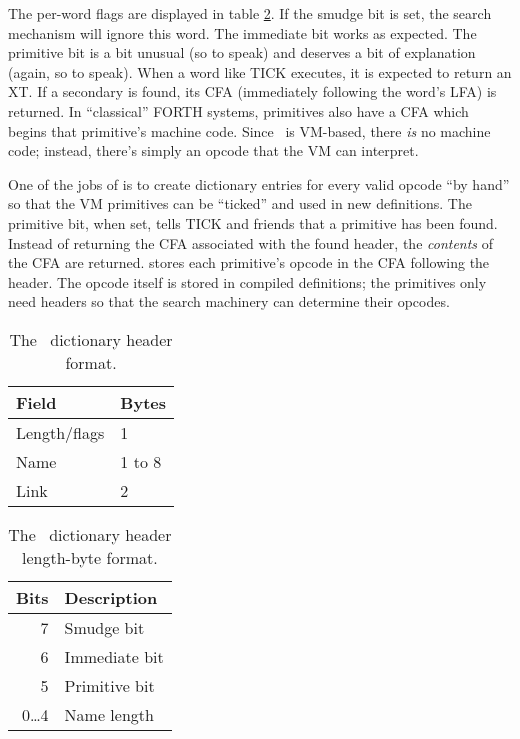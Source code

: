 \documentclass{article}
\begin{document}
The per-word flags are displayed in table \ref{t:hlen}. If the
smudge bit is set, the search mechanism will ignore this word. The
immediate bit works as expected. The primitive bit is a bit unusual
(so to speak) and deserves a bit of explanation (again, so to
speak). When a word like TICK executes, it is expected to return an
XT. If a secondary is found, its CFA (immediately following the
word's LFA) is returned. In ``classical'' FORTH systems, primitives
also have a CFA which begins that primitive's machine code. Since
\M\ is VM-based, there \textit{is} no machine code; instead, there's
simply an opcode that the VM can interpret.

One of the jobs of  is to create dictionary entries
for every valid opcode ``by hand'' so that the VM primitives can be
``ticked'' and used in new definitions. The primitive bit, when set,
tells TICK and friends that a primitive has been found. Instead of
returning the CFA associated with the found header, the
\textit{contents} of the CFA are returned.  stores
each primitive's opcode in the CFA following the header. The opcode
itself is stored in compiled definitions; the primitives only need
headers so that the search machinery can determine their opcodes.

\begin{table}
\begin{center}
\begin{tabular}{|l|l|} \hline
\textbf{Field} & \textbf{Bytes} \\ \hline
Length/flags & 1 \\ \hline
Name & 1 to 8 \\ \hline
Link & 2 \\ \hline
\end{tabular}
\end{center}
\caption{The \M\ dictionary header format.}
\label{t:head}
\end{table}

\begin{table}
\begin{center}
\begin{tabular}{|r|l|} \hline
\textbf{Bits} & \textbf{Description} \\ \hline
7         & Smudge bit \\ \hline
6         & Immediate bit \\ \hline
5         & Primitive bit \\ \hline
0\ldots 4 & Name length \\ \hline
\end{tabular}
\end{center}
\caption{The \M\ dictionary header length-byte format.}
\label{t:hlen}
\end{table}
\end{document}
